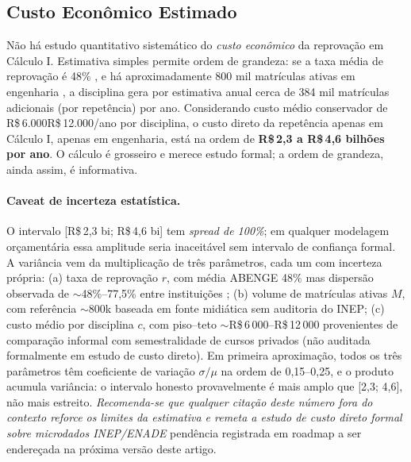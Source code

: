 \documentclass[12pt,a4paper,oneside]{article}
\begin{document}
\subsection{Custo Econômico Estimado}

Não há estudo quantitativo sistemático do \emph{custo econômico} da
reprovação em Cálculo I. Estimativa simples permite ordem de
grandeza: se a taxa média de reprovação é 48\%
\cite{ref:abenge-reprovacao}, e há aproximadamente 800 mil
matrículas ativas em engenharia \cite{ref:otempo-deficit}, a
disciplina gera por estimativa anual cerca de 384 mil matrículas
adicionais (por repetência) por ano. Considerando custo médio
conservador de R\$\,6.000\textendash R\$\,12.000/ano por
disciplina, o custo direto da repetência apenas em Cálculo I,
apenas em engenharia, está na ordem de \textbf{R\$\,2,3 a
R\$\,4,6 bilhões por ano}. O cálculo é grosseiro e merece estudo
formal; a ordem de grandeza, ainda assim, é informativa.

\paragraph{Caveat de incerteza estatística.} O intervalo
[R\$\,2,3 bi; R\$\,4,6 bi] tem \emph{spread de 100\%}; em qualquer
modelagem orçamentária essa amplitude seria inaceitável sem
intervalo de confiança formal. A variância vem da multiplicação de
três parâmetros, cada um com incerteza própria: (a) taxa de
reprovação $r$, com média ABENGE 48\% \cite{ref:abenge-reprovacao}
mas dispersão observada de $\sim$48\%--77,5\% entre instituições
\cite{ref:caeng-ufrj,ref:unicamp-calculo}; (b) volume de matrículas
ativas $M$, com referência $\sim$800k baseada em fonte midiática
\cite{ref:otempo-deficit} sem auditoria do INEP; (c) custo médio
por disciplina $c$, com piso--teto $\sim$R\$\,6\,000--R\$\,12\,000
provenientes de comparação informal com semestralidade de cursos
privados (não auditada formalmente em estudo de custo direto).
Em primeira aproximação, todos os três parâmetros têm coeficiente
de variação $\sigma/\mu$ na ordem de 0,15--0,25, e o produto
acumula variância: o intervalo honesto provavelmente é mais
amplo que [2,3; 4,6], não mais estreito. \emph{Recomenda-se que
qualquer citação deste número fora do contexto reforce os limites
da estimativa e remeta a estudo de custo direto formal sobre
microdados INEP/ENADE} \textemdash{} pendência registrada em
roadmap a ser endereçada na próxima versão deste artigo.

\end{document}
